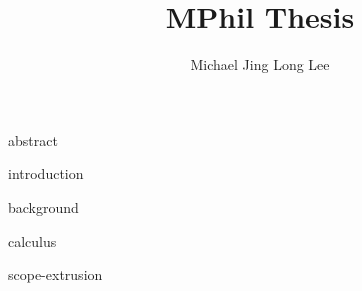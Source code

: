 \documentclass[12pt,a4paper,twoside,openany,BCOR=2cm]{scrbook}
\title{MPhil Thesis}
\author{Michael Jing Long Lee}
\begin{document}
\frontmatter
{
\maketitle

\hypersetup{linkcolor=black, linkbordercolor=white}
\tableofcontents


{abstract}
 }
\mainmatter
{introduction}

{background}

{calculus}

{scope-extrusion}


\end{document}

